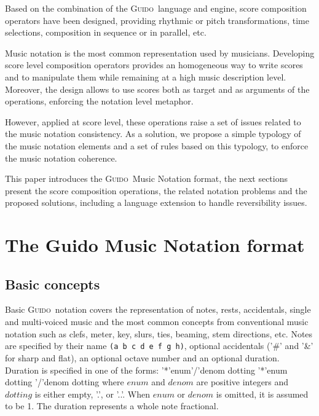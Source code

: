 \documentclass[twoside,10pt,a4paper]{article}
\newenvironment{gmncode}		{\vspace{-2mm}\small\verbatim}{\endverbatim\vspace{-2mm}}
\newcommand{\Guido}		{\textsc{Guido}}
\newcommand{\code}[1]		{{\small \texttt{#1}}}
\begin{document}
Based on the combination of the \Guido\ language and engine, score composition operators have been designed, providing rhythmic or pitch transformations, time selections, composition in sequence or in parallel, etc.

Music notation is the most common representation used by musicians. Developing score level composition operators provides an homogeneous way to write scores and to manipulate them while remaining at a high music description level. Moreover, the design allows to use scores both as target and as arguments of the operations, enforcing the notation level metaphor.

However, applied at score level, these operations raise a set of issues related to the music notation consistency. As a solution, we propose a simple typology of the music notation elements and a set of rules based on this typology, to enforce the music notation coherence.

This paper introduces the \Guido\ Music Notation format, the next sections present the score composition operations, the related notation problems and the proposed solutions, including a language extension to handle reversibility issues.

\section{The Guido Music Notation format}

\subsection{Basic concepts}
Basic \Guido\ notation covers the representation of notes, rests, accidentals, single and multi-voiced music and the most common concepts from conventional music notation such as clefs, meter, key, slurs, ties, beaming, stem directions, etc.
Notes are specified by their name \code{(a b c d e f g h)}, optional accidentals ('\#' and '\&' for sharp and flat), an optional octave number and an optional duration. \\
Duration is specified in one of the forms: 
\begin{gmncode} 
   '*'enum'/'denom dotting
   '*'enum dotting 
   '/'denom dotting
\end{gmncode} 
\noindent where $enum$ and $denom$ are positive integers and $dotting$ is either empty, '.', or '..'. When $enum$ or $denom$ is omitted, it is assumed to be 1. The duration represents a whole note fractional.
\end{document}
